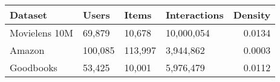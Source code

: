 \begin{tabular}{llllr}
\toprule
 Dataset       & Users   & Items   & Interactions   &   Density \\
\midrule
 Movielens 10M & 69,879  & 10,678  & 10,000,054     &    0.0134 \\
 Amazon        & 100,085 & 113,997 & 3,944,862      &    0.0003 \\
 Goodbooks     & 53,425  & 10,001  & 5,976,479      &    0.0112 \\
\bottomrule
\end{tabular}